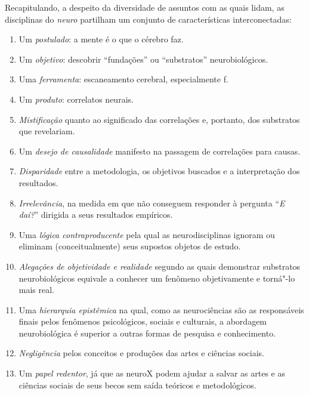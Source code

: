 Recapitulando, a despeito da diversidade de assuntos com as quais lidam,
as disciplinas do \emph{neuro} partilham um conjunto de características
interconectadas:

\begin{enumerate}
\item Um \emph{postulado}: a mente é o que o cérebro faz.

\item Um \emph{objetivo}: descobrir ``fundações'' ou ``substratos''
neurobiológicos.

\item Uma \emph{ferramenta}: escaneamento cerebral, especialmente f.

\item Um \emph{produto}: correlatos neurais.

\item \emph{Mistificação} quanto ao significado das correlações e,
portanto, dos substratos que revelariam.

\item Um \emph{desejo de causalidade} manifesto na passagem de
correlações para causas.

\item \emph{Disparidade} entre a metodologia, os objetivos buscados e a
interpretação dos resultados.

\item \emph{Irrelevância}, na medida em que não conseguem responder à
pergunta ``\emph{E daí?}'' dirigida a seus resultados empíricos.

\item Uma \emph{lógica contraproducente} pela qual as neurodisciplinas
ignoram ou eliminam (conceitualmente) seus supostos objetos de estudo.

\item \emph{Alegações de objetividade e realidade} segundo as quais
demonstrar substratos neurobiológicos equivale a conhecer um fenômeno
objetivamente e torná"-lo mais real.

\item Uma \emph{hierarquia epistêmica} na qual, como as neurociências
são as responsáveis finais pelos fenômenos psicológicos, sociais e
culturais, a abordagem neurobiológica é superior a outras formas de
pesquisa e conhecimento.

\item \emph{Negligência} pelos conceitos e produções das artes e
ciências sociais.

\item Um \emph{papel redentor}, já que as neuroX podem ajudar a salvar
as artes e as ciências sociais de seus becos sem saída teóricos e
metodológicos.
\end{enumerate}

